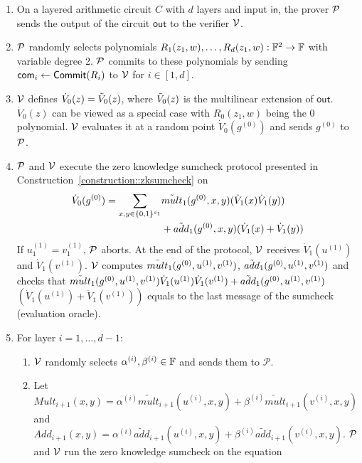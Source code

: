\begin{mdframed}[nobreak=false]
	\begin{construction}\label{construction:zkgkr}
		\begin{enumerate} 
			\item On a layered arithmetic circuit $C$ with $d$ layers and input $\mathsf{in}$, the prover $\P$ sends the output of the circuit $\mathsf{out}$ to the verifier $\V$.
			
			\item $\P$ randomly selects polynomials $R_1(z_1, w), \ldots, R_d(z_1, w): \F^2\rightarrow \F$ with variable degree 2. $\P$ commits to these polynomials by sending $\comm_i\leftarrow\Commit(R_i)$ to $\V$ for $i\in[1,d]$.
			
			\item $\V$ defines $\dot{V}_0(z)= \tV_0(z)$, where $\tV_0(z)$ is the multilinear extension of $\mathsf{out}$. $\dot{V}_0(z)$ can be viewed as a special case with $R_0(z_1,w)$ being the 0 polynomial. $\V$ evaluates it at a random point $\dot{V}_0(g^{(0)})$ and sends $g^{(0)}$ to $\P$.
			
			\item $\P$ and $\V$ execute the zero knowledge sumcheck protocol presented in Construction~\ref{construction::zksumcheck} on
			\[
			\begin{aligned}
			\dot{V}_{0}(g^{(0)})=\sum_{x, y\in \binary^{s_{1}}}&\tilde{mult}_{1}(g^{(0)}, x, y)(\dot{V}_{1}(x)\dot{V}_{1}(y))\\
			&+\tilde{add}_{1}(g^{(0)},x,y)(\dot{V}_{1}(x)+\dot{V}_{1}(y))
		    \end{aligned}
			\]
			If $u_1^{(1)} = v_1^{(1)}$, $\P$ aborts. At the end of the protocol, $\V$ receives $\dot{V}_1(u^{(1)})$ and $\dot{V}_1(v^{(1)})$. $\V$ computes $\tmult_1(g^{(0)},u^{(1)},v^{(1)})$, $\tadd_1(g^{(0)},u^{(1)},v^{(1)})$ and checks that $\tmult_1(g^{(0)},u^{(1)},v^{(1)})\dot{V}_1(u^{(1)})\dot{V}_1(v^{(1)})+\tadd_1(g^{(0)},u^{(1)},v^{(1)})$ $(\dot{V}_1(u^{(1)})+\dot{V}_1(v^{(1)}))$ equals to the last message of the sumcheck (evaluation oracle).
			
			\item For layer $i=1,\ldots, d-1$:
			\begin{enumerate}
				\item $\V$ randomly selects $\alpha^{(i)}, \beta^{(i)}\in\F$ and sends them to $\mathcal{P}$.
				\item  Let $Mult_{i + 1}(x, y) = \alpha^{(i)}\tilde{mult}_{i+1}(u^{(i)}, x, y)+\beta^{(i)}\tilde{mult}_{i+1}(v^{(i)}, x, y)$ and $Add_{i + 1}(x, y) = \alpha^{(i)}\tilde{add}_{i+1}(u^{(i)}, x, y)+\beta^{(i)}\tilde{add}_{i+1}(v^{(i)}, x, y)$. $\P$ and $\V$ run the zero knowledge sumcheck on the equation\\
				

\end{enumerate}
\end{enumerate}
\end{construction}
\end{mdframed}
